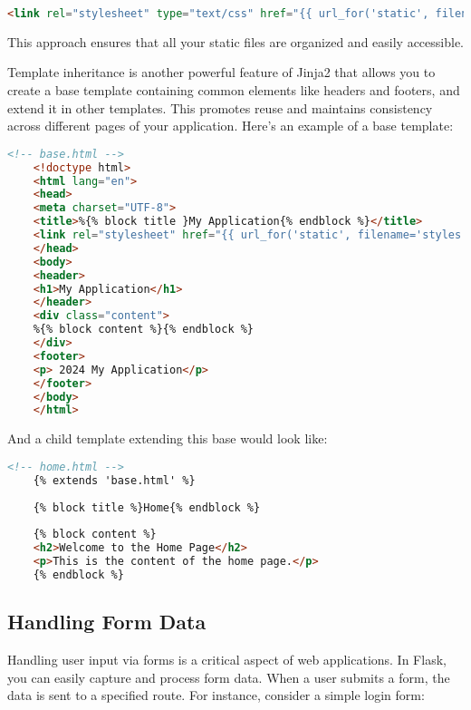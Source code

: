 \begin{lstlisting}[language=HTML]
	<link rel="stylesheet" type="text/css" href="{{ url_for('static', filename='styles.css') }}">
\end{lstlisting}

This approach ensures that all your static files are organized and easily accessible.

Template inheritance is another powerful feature of Jinja2 that allows you to create a base template containing common elements like headers and footers, and extend it in other templates.\cite{Grinberg:2018} This promotes reuse and maintains consistency across different pages of your application. Here’s an example of a base template:

\begin{lstlisting}[language=HTML]
	<!-- base.html -->
	<!doctype html>
	<html lang="en">
	<head>
	<meta charset="UTF-8">
	<title>%{% block title }My Application{% endblock %}</title>
	<link rel="stylesheet" href="{{ url_for('static', filename='styles.css') }}">
	</head>
	<body>
	<header>
	<h1>My Application</h1>
	</header>
	<div class="content">
	%{% block content %}{% endblock %}
	</div>
	<footer>
	<p> 2024 My Application</p>
	</footer>
	</body>
	</html>
\end{lstlisting}

And a child template extending this base would look like:

\begin{lstlisting}[language=HTML]
	<!-- home.html -->
	{% extends 'base.html' %}
	
	{% block title %}Home{% endblock %}
	
	{% block content %}
	<h2>Welcome to the Home Page</h2>
	<p>This is the content of the home page.</p>
	{% endblock %}
\end{lstlisting}


\subsection{Handling Form Data}

Handling user input via forms is a critical aspect of web applications. In Flask, you can easily capture and process form data. When a user submits a form, the data is sent to a specified route. For instance, consider a simple login form:

